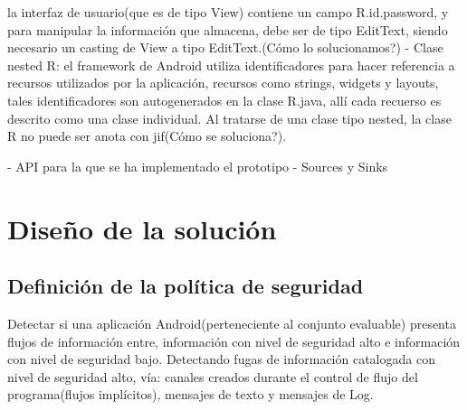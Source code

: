 la interfaz de usuario(que es de tipo View) contiene un campo R.id.password, y
para manipular la información que almacena, debe ser de tipo EditText, siendo
necesario un casting de View a tipo EditText.(Cómo lo solucionamos?)\newline
- Clase nested R: el framework de Android utiliza identificadores para hacer
referencia a recursos utilizados por la aplicación, recursos como strings,
widgets y layouts, tales identificadores son autogenerados en la clase R.java,
allí cada recuerso es descrito como una clase individual. Al tratarse de una
clase tipo nested, la clase R no puede ser anota con jif(Cómo se soluciona?).\newline
 
- API para la que se ha implementado el prototipo \newline 
- Sources y Sinks \newline

\section{Diseño de la solución} 
\subsection{Definición de la política de seguridad}
Detectar si una aplicación Android(perteneciente al conjunto evaluable) presenta
flujos de información entre, información con nivel de seguridad alto e
información con nivel de seguridad bajo.\newline 
Detectando fugas de información catalogada con nivel de seguridad alto, vía:
canales creados durante el control de flujo del programa(flujos implícitos),
mensajes de texto y mensajes de Log.\newline 

